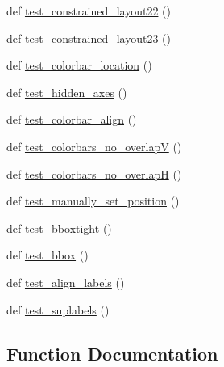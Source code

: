 \begin{DoxyCompactItemize}
\item 
def \hyperlink{namespacematplotlib_1_1tests_1_1test__constrainedlayout_a5c542021d1e4052008b76cad1efc4ccb}{test\+\_\+constrained\+\_\+layout22} ()
\item 
def \hyperlink{namespacematplotlib_1_1tests_1_1test__constrainedlayout_a0649088c08279b8e6dc0c4ecd2cbd83b}{test\+\_\+constrained\+\_\+layout23} ()
\item 
def \hyperlink{namespacematplotlib_1_1tests_1_1test__constrainedlayout_afe930072f418925c7e917b98b153c846}{test\+\_\+colorbar\+\_\+location} ()
\item 
def \hyperlink{namespacematplotlib_1_1tests_1_1test__constrainedlayout_a732ea97684f181de34f84039a3d42a86}{test\+\_\+hidden\+\_\+axes} ()
\item 
def \hyperlink{namespacematplotlib_1_1tests_1_1test__constrainedlayout_aacaf949dadb8fe36d230746cfebf811d}{test\+\_\+colorbar\+\_\+align} ()
\item 
def \hyperlink{namespacematplotlib_1_1tests_1_1test__constrainedlayout_a4bc2d2cceddfeceaa0e1cdf567ed3fc1}{test\+\_\+colorbars\+\_\+no\+\_\+overlapV} ()
\item 
def \hyperlink{namespacematplotlib_1_1tests_1_1test__constrainedlayout_a7ae7c99544ce10f6e3d9fe91f5eb5e9a}{test\+\_\+colorbars\+\_\+no\+\_\+overlapH} ()
\item 
def \hyperlink{namespacematplotlib_1_1tests_1_1test__constrainedlayout_a442ff4afd8dab371a0262d2e101ff73d}{test\+\_\+manually\+\_\+set\+\_\+position} ()
\item 
def \hyperlink{namespacematplotlib_1_1tests_1_1test__constrainedlayout_a282fac603b2baec2ca98738f11d89b7c}{test\+\_\+bboxtight} ()
\item 
def \hyperlink{namespacematplotlib_1_1tests_1_1test__constrainedlayout_a98be5e45b2cbf0a8c4c595ed28c7731e}{test\+\_\+bbox} ()
\item 
def \hyperlink{namespacematplotlib_1_1tests_1_1test__constrainedlayout_a80ca16e79e29bf2c0db4d1c29e195f2d}{test\+\_\+align\+\_\+labels} ()
\item 
def \hyperlink{namespacematplotlib_1_1tests_1_1test__constrainedlayout_a8c3dfd87e290fc9bffe2ae6fda9e366d}{test\+\_\+suplabels} ()
\end{DoxyCompactItemize}


\subsection{Function Documentation}
\mbox{\label{namespacematplotlib_1_1tests_1_1test__constrainedlayout_a6e4d1131936a5f2803c79031e19ebef9}} 
